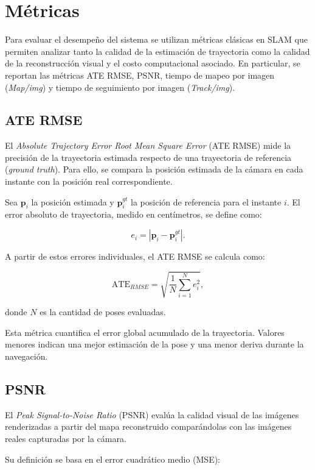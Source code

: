 \section{Métricas}

Para evaluar el desempeño del sistema se utilizan métricas clásicas en SLAM que permiten analizar tanto la calidad de la estimación de trayectoria como la calidad de la reconstrucción visual y el costo computacional asociado. En particular, se reportan las métricas ATE RMSE, PSNR, tiempo de mapeo por imagen (\textit{Map/img}) y tiempo de seguimiento por imagen (\textit{Track/img}).

\subsection{ATE RMSE}

El \textit{Absolute Trajectory Error Root Mean Square Error} (ATE RMSE) mide la precisión de la trayectoria estimada respecto de una trayectoria de referencia (\textit{ground truth}). Para ello, se compara la posición estimada de la cámara en cada instante con la posición real correspondiente.

Sea $\mathbf{p}_i$ la posición estimada y $\mathbf{p}_i^{gt}$ la posición de referencia para el instante $i$. El error absoluto de trayectoria, medido en centímetros, se define como:

$$
e_i = \left| \mathbf{p}_i - \mathbf{p}_i^{gt} \right|.
$$

A partir de estos errores individuales, el ATE RMSE se calcula como:

$$
\mathrm{ATE}_{RMSE}
=
\sqrt{
\frac{1}{N}
\sum_{i=1}^{N}
e_i^2
},
$$

\noindent donde $N$ es la cantidad de poses evaluadas.

Esta métrica cuantifica el error global acumulado de la trayectoria. Valores menores indican una mejor estimación de la pose y una menor deriva durante la navegación.

\subsection{PSNR}

El \textit{Peak Signal-to-Noise Ratio} (PSNR) evalúa la calidad visual de las imágenes renderizadas a partir del mapa reconstruido comparándolas con las imágenes reales capturadas por la cámara.

Su definición se basa en el error cuadrático medio (MSE):

